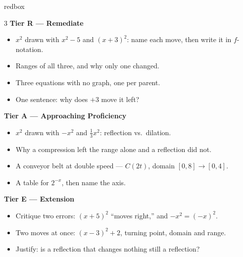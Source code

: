 \documentclass[10pt]{article}
\begin{document}
\boxguard
\begin{skillbox}{redbox}
\begin{multicols}{3}
\textbf{Tier R --- Remediate}
\begin{itemize}[leftmargin=1em, itemsep=1pt, topsep=2pt]
  \item $x^2$ drawn with $x^2-5$ and $(x+3)^2$: name each move, then write it in $f$-notation.
  \item Ranges of all three, and why only one changed.
  \item Three equations with no graph, one per parent.
  \item One sentence: why does $+3$ move it left?
\end{itemize}

\columnbreak
\textbf{Tier A --- Approaching Proficiency}
\begin{itemize}[leftmargin=1em, itemsep=1pt, topsep=2pt]
  \item $x^2$ drawn with $-x^2$ and $\tfrac13 x^2$: reflection vs.\ dilation.
  \item Why a compression left the range alone and a reflection did not.
  \item A conveyor belt at double speed --- $C(2t)$, domain $[0,8] \to [0,4]$.
  \item A table for $2^{-x}$, then name the axis.
\end{itemize}

\columnbreak
\textbf{Tier E --- Extension}
\begin{itemize}[leftmargin=1em, itemsep=1pt, topsep=2pt]
  \item Critique two errors: $(x+5)^2$ ``moves right,'' and $-x^2 = (-x)^2$.
  \item Two moves at once: $(x-3)^2+2$, turning point, domain and range.
  \item Justify: is a reflection that changes nothing still a reflection?
\end{itemize}
\end{multicols}
\end{skillbox}
\end{document}
